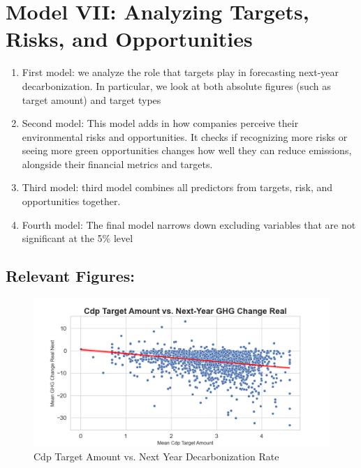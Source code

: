 \begin{itemize}
\end{itemize}


\section{Model VII: Analyzing Targets, Risks, and Opportunities}

\begin{enumerate}
    \item First model: we analyze the role that targets play in forecasting next-year decarbonization. In particular, we look at both absolute figures (such as target amount) and target types

    \item Second model: This model adds in how companies perceive their environmental risks and opportunities. It checks if recognizing more risks or seeing more green opportunities changes how well they can reduce emissions, alongside their financial metrics and targets.
    \item Third model: third model combines all predictors from targets, risk, and opportunities together.
    \item Fourth model: The final model narrows down excluding variables that are not significant at the 5\% level
\end{enumerate}




\subsection{Relevant Figures:}

\begin{figure}[H]
\centering
  \includegraphics[width=\textwidth]{figures/cdp_target_amount_vs_ghg_change_real_next.png}
\caption{Cdp Target Amount vs. Next Year Decarbonization Rate}
\label{fig:cdp_target_amount_vs_ghg_change_real_next}
\end{figure}


